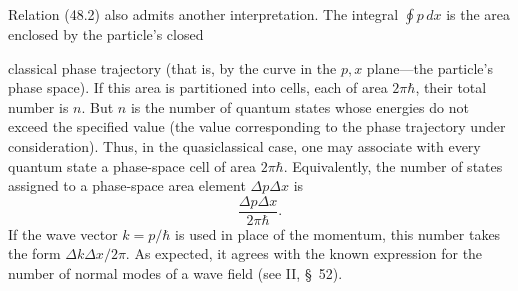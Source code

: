 Relation (48.2) also admits another interpretation. The integral
$\oint p\,dx$ is the area enclosed by the particle's closed

classical phase trajectory (that is, by the curve in the $p,x$ plane---the
particle's phase space). If this area is partitioned into cells, each of area
$2\pi\hbar$, their total number is $n$. But $n$ is the number of quantum
states whose energies do not exceed the specified value (the value
corresponding to the phase trajectory under consideration). Thus, in the
quasiclassical case, one may associate with every quantum state a phase-space
cell of area $2\pi\hbar$. Equivalently, the number of states assigned to a
phase-space area element $\Delta p\Delta x$ is
\begin{equation}
  \frac{\Delta p\Delta x}{2\pi\hbar}.
  \tag{48.4}
\end{equation}
If the wave vector $k=p/\hbar$ is used in place of the momentum, this number
takes the form $\Delta k\Delta x/2\pi$. As expected, it agrees with the known
expression for the number of normal modes of a wave field (see II, §~52).
